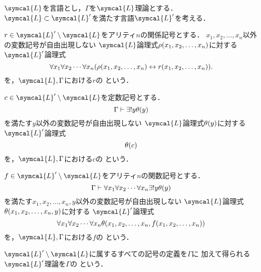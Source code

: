 \begin{Def} \label{Def:extensionbydefinition}
	\(\symcal{L}\)を言語とし，\(\Gamma\)を\(\symcal{L}\)理論とする．
	\(\symcal{L} \subset \symcal{L}'\)を満たす言語\(\symcal{L}'\)を考える．

	\(r \in \symcal{L}' \setminus \symcal{L}\)をアリティ\(n\)の関係記号とする．
	\(x_1, x_2, \dots, x_n\)以外の変数記号が自由出現しない
	\(\symcal{L}\)論理式\(\apply{\rho}{x_1, x_2, \dots, x_n}\)に対する
	\(\symcal{L}'\)論理式
	\begin{equation}
		\forall x_1 \forall x_2 \dotsb \forall x_n \paren{\apply{\rho}{x_1, x_2, \dots, x_n} \formulaequiv \apply{r}{x_1, x_2, \dots, x_n}}.
		\label{eq:extensionbydefinitionrelationalsymbol}
	\end{equation}
	を，\(\symcal{L}, \Gamma\)における\(r\)の
	という．

	\(c \in \symcal{L}' \setminus \symcal{L}\)を定数記号とする．
	\begin{equation}
		\Gamma \provable \uexists y \apply{\theta}{y}
		\label{eq:definitionconstantsymbol}
	\end{equation}
	を満たす\(y\)以外の変数記号が自由出現しない
	\(\symcal{L}\)論理式\(\apply{\theta}{y}\)に対する
	\(\symcal{L}'\)論理式
	\begin{equation}
		\apply{\theta}{c}
		\label{eq:extensionbydefinitionconstantsymbol}
	\end{equation}
	を，\(\symcal{L}, \Gamma\)における\(c\)の%
	という．

	\(f \in \symcal{L}' \setminus \symcal{L}\)をアリティ\(n\)の関数記号とする．
	\begin{equation}
		\Gamma \provable \forall x_1 \forall x_2 \dotsb \forall x_n \uexists y \apply{\theta}{y}
		\label{eq:definitionfunctionsymbol}
	\end{equation}
	を満たす\(x_1, x_2, \dots, x_n, y\)以外の変数記号が自由出現しない
	\(\symcal{L}\)論理式\(\apply{\theta}{x_1, x_2, \dots, x_n, y}\)に対する
	\(\symcal{L}'\)論理式
	\begin{equation}
		\forall x_1 \forall x_2 \dotsb \forall x_n \apply{\theta}{x_1, x_2, \dots, x_n, \apply{f}{x_1, x_2, \dots, x_n}}
		\label{eq:extensionbydefinitionfunctionsymbol}
	\end{equation}
	を，\(\symcal{L}, \Gamma\)における\(f\)の%
	という．

	\(\symcal{L}' \setminus \symcal{L}\)に属するすべての記号の定義を\(\Gamma\)に
	加えて得られる\(\symcal{L}'\)理論を\(\Gamma\)の%
	という．
\end{Def}

